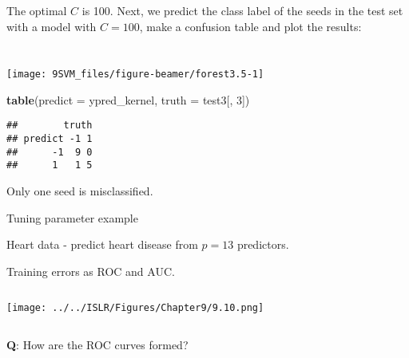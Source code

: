 \documentclass[10pt,ignorenonframetext,]{beamer}
\newenvironment{Shaded}{\begin{snugshade}}{\end{snugshade}}
\newcommand{\DataTypeTok}[1]{\textcolor[rgb]{0.13,0.29,0.53}{#1}}
\newcommand{\DecValTok}[1]{\textcolor[rgb]{0.00,0.00,0.81}{#1}}
\newcommand{\KeywordTok}[1]{\textcolor[rgb]{0.13,0.29,0.53}{\textbf{#1}}}
\newcommand{\NormalTok}[1]{#1}
\newcommand{\OperatorTok}[1]{\textcolor[rgb]{0.81,0.36,0.00}{\textbf{#1}}}
\newcommand{\StringTok}[1]{\textcolor[rgb]{0.31,0.60,0.02}{#1}}
\begin{document}
\begin{frame}[fragile]

The optimal \(C\) is 100. Next, we predict the class label of the seeds
in the test set with a model with \(C=100\), make a confusion table and
plot the results:

\(~\)

\scriptsize

\begin{Shaded}
\end{Shaded}

\(~\)

\begin{center}\texttt{[image: 9SVM\_files/figure-beamer/forest3.5-1]} \end{center}

\end{frame}

\begin{frame}[fragile]

\scriptsize

\begin{Shaded}
\begin{Highlighting}[]
\KeywordTok{table}\NormalTok{(}\DataTypeTok{predict =}\NormalTok{ ypred_kernel, }\DataTypeTok{truth =}\NormalTok{ test3[, }\DecValTok{3}\NormalTok{])}
\end{Highlighting}
\end{Shaded}

\begin{verbatim}
##        truth
## predict -1 1
##      -1  9 0
##      1   1 5
\end{verbatim}

\normalsize

Only one seed is misclassified.

\end{frame}

\begin{frame}

\begin{block}{Tuning parameter example}

\vspace{2mm}

Heart data - predict heart disease from \(p=13\) predictors.

Training errors as ROC and AUC.

\vspace{1mm}

\(~\) \centering

\texttt{[image: ../../ISLR/Figures/Chapter9/9.10.png]}

\(~\)

\flushleft

\textbf{Q}: How are the ROC curves formed?

\end{block}

\end{frame}
\end{document}
